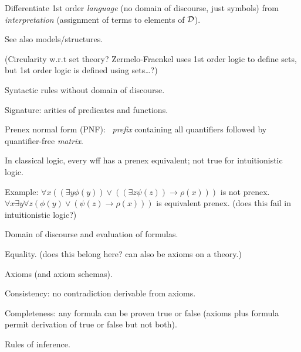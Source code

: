 Differentiate 1st order \textit{language} 
(no domain of discourse, just symbols)
from \textit{interpretation} 
(assignment of terms to elements of $\mathcal{D}$).

See also models/structures.~\cite{wiki:Model_theory}

(Circularity w.r.t set theory?
Zermelo-Fraenkel uses 1st order logic to define sets,
but 1st order logic is defined using sets\ldots?)


\label{sec:First_order_language}

Syntactic rules without domain of discourse.

Signature: arities of predicates and functions.

Prenex normal form (PNF):~\cite{wiki:Prenex_normal_form} 
\textit{prefix} containing all quantifiers 
followed by quantifier-free \textit{matrix}.

In classical logic, every wff has a prenex equivalent;
not true for intuitionistic logic.

Example:
$\forall x 
((\exists y\phi (y))
\lor 
((\exists z\psi (z))\rightarrow \rho (x)))$ is not prenex.
$\forall x\exists y\forall z
(\phi (y)\lor (\psi (z)\rightarrow \rho (x)))$ 
is equivalent prenex. 
(does this fail in intuitionistic logic?)



\label{sec:First_order_model}

Domain of discourse and evaluation of formulas.

Equality.
(does this belong here? can also be axioms on a theory.)

\label{sec:First_order_theory}

Axioms (and axiom schemas).~\cite{wiki:List_of_first_order_theories}

Consistency: no contradiction derivable from axioms.

Completeness: any formula can be proven 
\textsf{true} or \textsf{false} 
(axioms plus formula permit derivation of 
\textsf{true} or \textsf{false} but not both).

\label{sec:First_order_deductive_systems}

Rules of inference.

\label{sec:Monadic_first_order_logic}

